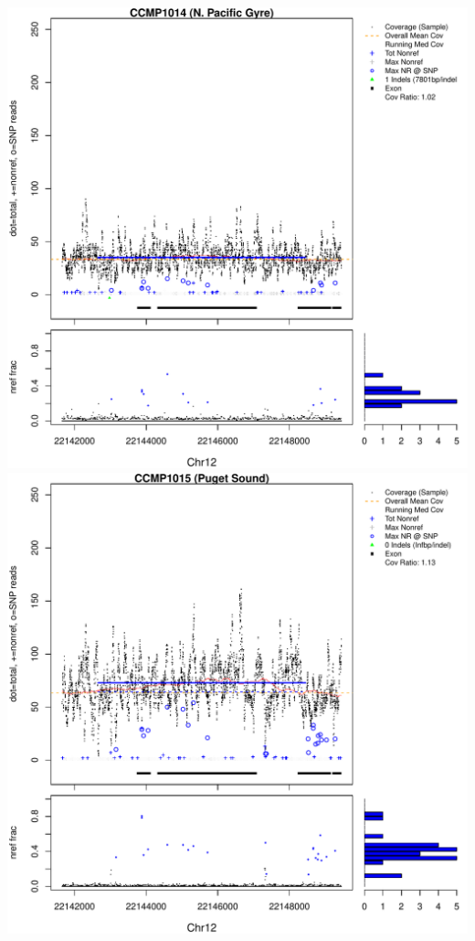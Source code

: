 \documentclass{article}\usepackage[]{graphicx}\usepackage[]{color}
\makeatletter
\def\maxwidth{ %
  \ifdim\Gin@nat@width>\linewidth
    \linewidth
  \else
    \Gin@nat@width
  \fi
}
\newenvironment{knitrout}{}{} %
\makeatother
\begin{document}
\begin{knitrout}
{\includegraphics[width=\maxwidth]{figs-knitr/unnamed-chunk-56-5} 
\includegraphics[width=\maxwidth]{figs-knitr/unnamed-chunk-56-6} 
}
\end{knitrout}
\end{document}
